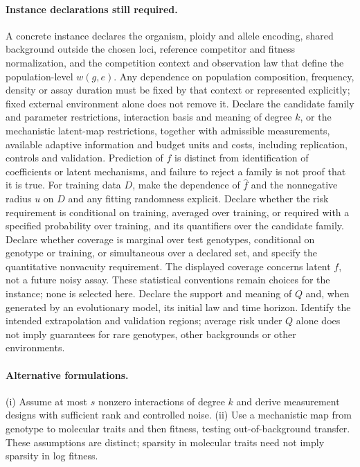 \documentclass[11pt]{article}
\begin{document}
\paragraph{Instance declarations still required.} A concrete instance declares the organism, ploidy and allele encoding, shared background outside the chosen loci, reference competitor and fitness normalization, and the competition context and observation law that define the population-level $w(g,e)$. Any dependence on population composition, frequency, density or assay duration must be fixed by that context or represented explicitly; fixed external environment alone does not remove it. Declare the candidate family and parameter restrictions, interaction basis and meaning of degree $k$, or the mechanistic latent-map restrictions, together with admissible measurements, available adaptive information and budget units and costs, including replication, controls and validation. Prediction of $f$ is distinct from identification of coefficients or latent mechanisms, and failure to reject a family is not proof that it is true. For training data $D$, make the dependence of $\widehat f$ and the nonnegative radius $u$ on $D$ and any fitting randomness explicit. Declare whether the risk requirement is conditional on training, averaged over training, or required with a specified probability over training, and its quantifiers over the candidate family. Declare whether coverage is marginal over test genotypes, conditional on genotype or training, or simultaneous over a declared set, and specify the quantitative nonvacuity requirement. The displayed coverage concerns latent $f$, not a future noisy assay. These statistical conventions remain choices for the instance; none is selected here. Declare the support and meaning of $Q$ and, when generated by an evolutionary model, its initial law and time horizon. Identify the intended extrapolation and validation regions; average risk under $Q$ alone does not imply guarantees for rare genotypes, other backgrounds or other environments.
\paragraph{Alternative formulations.} (i) Assume at most $s$ nonzero interactions of degree $k$ and derive measurement designs with sufficient rank and controlled noise. (ii) Use a mechanistic map from genotype to molecular traits and then fitness, testing out-of-background transfer. These assumptions are distinct; sparsity in molecular traits need not imply sparsity in log fitness.
\end{document}
